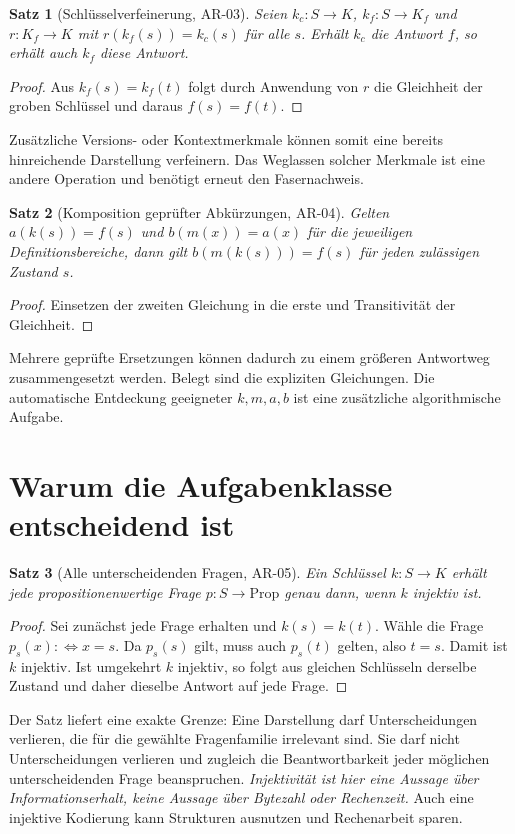 \documentclass[11pt,a4paper]{article}
\newtheorem{satz}{Satz}
\newcommand{\AR}[1]{\textsf{AR-#1}}
\begin{document}
\begin{satz}[Schlüsselverfeinerung, \AR{03}]
Seien $k_c:S\to K$, $k_f:S\to K_f$ und $r:K_f\to K$ mit
$r(k_f(s))=k_c(s)$ für alle $s$. Erhält $k_c$ die Antwort $f$, so erhält auch $k_f$
diese Antwort.
\end{satz}
\begin{proof}
Aus $k_f(s)=k_f(t)$ folgt durch Anwendung von $r$ die Gleichheit der groben
Schlüssel und daraus $f(s)=f(t)$.
\end{proof}
Zusätzliche Versions- oder Kontextmerkmale können somit eine bereits hinreichende
Darstellung verfeinern. Das Weglassen solcher Merkmale ist eine andere Operation
und benötigt erneut den Fasernachweis.

\begin{satz}[Komposition geprüfter Abkürzungen, \AR{04}]
Gelten $a(k(s))=f(s)$ und $b(m(x))=a(x)$ für die jeweiligen Definitionsbereiche,
dann gilt $b(m(k(s)))=f(s)$ für jeden zulässigen Zustand $s$.
\end{satz}
\begin{proof}
Einsetzen der zweiten Gleichung in die erste und Transitivität der Gleichheit.
\end{proof}
Mehrere geprüfte Ersetzungen können dadurch zu einem größeren Antwortweg
zusammengesetzt werden. Belegt sind die expliziten Gleichungen. Die automatische
Entdeckung geeigneter $k,m,a,b$ ist eine zusätzliche algorithmische Aufgabe.

\section{Warum die Aufgabenklasse entscheidend ist}
\begin{satz}[Alle unterscheidenden Fragen, \AR{05}]
Ein Schlüssel $k:S\to K$ erhält jede propositionenwertige Frage $p:S\to\mathrm{Prop}$
genau dann, wenn $k$ injektiv ist.
\end{satz}
\begin{proof}
Sei zunächst jede Frage erhalten und $k(s)=k(t)$. Wähle die Frage
$p_s(x):\!\iff x=s$. Da $p_s(s)$ gilt, muss auch $p_s(t)$ gelten, also $t=s$.
Damit ist $k$ injektiv. Ist umgekehrt $k$ injektiv, so folgt aus gleichen
Schlüsseln derselbe Zustand und daher dieselbe Antwort auf jede Frage.
\end{proof}
Der Satz liefert eine exakte Grenze: Eine Darstellung darf Unterscheidungen
verlieren, die für die gewählte Fragenfamilie irrelevant sind. Sie darf nicht
Unterscheidungen verlieren und zugleich die Beantwortbarkeit jeder möglichen
unterscheidenden Frage beanspruchen. \emph{Injektivität ist hier eine Aussage über
Informationserhalt, keine Aussage über Bytezahl oder Rechenzeit.} Auch eine
injektive Kodierung kann Strukturen ausnutzen und Rechenarbeit sparen.
\end{document}
